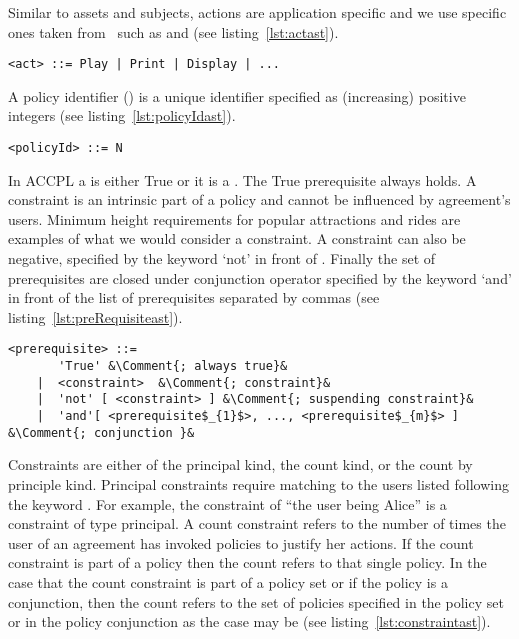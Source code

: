 Similar to assets and subjects, actions are application specific and we use specific ones taken from~\cite{pucella2006} such as  and  (see listing~\ref{lst:actast}).

\lstset{mathescape, language=AST}  
\begin{lstlisting}[frame=single, caption={act},label={lst:actast}]
<act> ::= Play | Print | Display | ...
\end{lstlisting}

A policy identifier () is a unique identifier specified as (increasing) positive integers (see listing~\ref{lst:policyIdast}).

\lstset{mathescape, language=AST}  
\begin{lstlisting}[frame=single, caption={policyId},label={lst:policyIdast}]
<policyId> ::= N
\end{lstlisting}

In \ac{ACCPL} a  is either True or it is a . The True prerequisite always holds. A constraint is an intrinsic part of a policy and cannot be influenced by agreement's users. Minimum height requirements for popular attractions and rides are examples of what we would consider a constraint. A constraint can also be negative, specified by the keyword `not' in front of . Finally the set of prerequisites are closed under conjunction operator specified by the keyword `and' in front of the list of prerequisites separated by commas (see listing~\ref{lst:preRequisiteast}).


\lstset{mathescape, language=AST, escapechar=\&}  
\begin{lstlisting}[frame=single, caption={prerequisite},label={lst:preRequisiteast}]
<prerequisite> ::=  
       'True' &\Comment{; always true}&
    |  <constraint>	 &\Comment{; constraint}&
    |  'not' [ <constraint> ] &\Comment{; suspending constraint}&
    |  'and'[ <prerequisite$_{1}$>, ..., <prerequisite$_{m}$> ] &\Comment{; conjunction }&
\end{lstlisting}

Constraints are either of the principal kind, the count kind, or the count by principle kind. Principal constraints require matching to the users listed following the keyword . For example, the constraint of ``the user being Alice'' is a constraint of type principal. A count constraint refers to the number of times the user of an agreement has invoked policies to justify her actions. If the count constraint is part of a policy then the count refers to that single policy. In the case that the count constraint is part of a policy set or if the policy is a conjunction, then the count refers to the set of policies specified in the policy set or in the policy conjunction as the case may be (see listing~\ref{lst:constraintast}).

